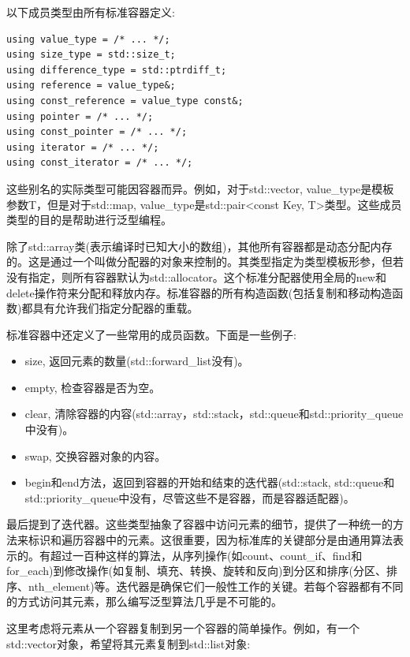 以下成员类型由所有标准容器定义:

\begin{lstlisting}[style=styleCXX]
using value_type = /* ... */;
using size_type = std::size_t;
using difference_type = std::ptrdiff_t;
using reference = value_type&;
using const_reference = value_type const&;
using pointer = /* ... */;
using const_pointer = /* ... */;
using iterator = /* ... */;
using const_iterator = /* ... */;
\end{lstlisting}

这些别名的实际类型可能因容器而异。例如，对于std::vector, value\_type是模板参数T，但是对于std::map, value\_type是std::pair<const Key, T>类型。这些成员类型的目的是帮助进行泛型编程。

除了std::array类(表示编译时已知大小的数组)，其他所有容器都是动态分配内存的。这是通过一个叫做分配器的对象来控制的。其类型指定为类型模板形参，但若没有指定，则所有容器默认为std::allocator。这个标准分配器使用全局的new和delete操作符来分配和释放内存。标准容器的所有构造函数(包括复制和移动构造函数)都具有允许我们指定分配器的重载。

标准容器中还定义了一些常用的成员函数。下面是一些例子:

\begin{itemize}
\item
size, 返回元素的数量(std::forward\_list没有)。

\item
empty, 检查容器是否为空。

\item
clear, 清除容器的内容(std::array，std::stack，std::queue和std::priority\_queue中没有)。

\item
swap, 交换容器对象的内容。

\item
begin和end方法，返回到容器的开始和结束的迭代器(std::stack, std::queue和std::priority\_queue中没有，尽管这些不是容器，而是容器适配器)。
\end{itemize}

最后提到了迭代器。这些类型抽象了容器中访问元素的细节，提供了一种统一的方法来标识和遍历容器中的元素。这很重要，因为标准库的关键部分是由通用算法表示的。有超过一百种这样的算法，从序列操作(如count、count\_if、find和for\_each)到修改操作(如复制、填充、转换、旋转和反向)到分区和排序(分区、排序、nth\_element)等。迭代器是确保它们一般性工作的关键。若每个容器都有不同的方式访问其元素，那么编写泛型算法几乎是不可能的。

这里考虑将元素从一个容器复制到另一个容器的简单操作。例如，有一个std::vector对象，希望将其元素复制到std::list对象:

